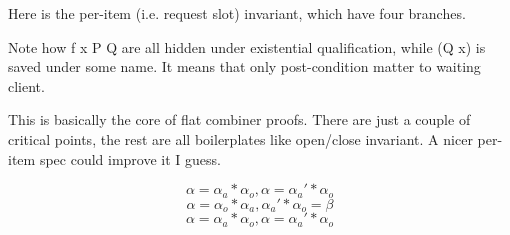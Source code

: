 \documentclass[11pt]{article}
\begin{document}
Here is the per-item (i.e. request slot) invariant, which have four branches.

Note how f x P Q are all hidden under existential qualification, while (Q x) is saved under some name. It means that only post-condition matter to waiting client.

This is basically the core of flat combiner proofs. There are just a couple of critical points, the rest are all boilerplates like open/close invariant. A nicer per-item spec could improve it I guess.

\[\alpha = \alpha_a * \alpha_o, \alpha = \alpha_a' * \alpha_o\]
\[\alpha = \alpha_o * \alpha_a, \alpha_a' * \alpha_o = \beta\]
\[\alpha = \alpha_a * \alpha_o, \alpha = \alpha_a' * \alpha_o\]
\end{document}
